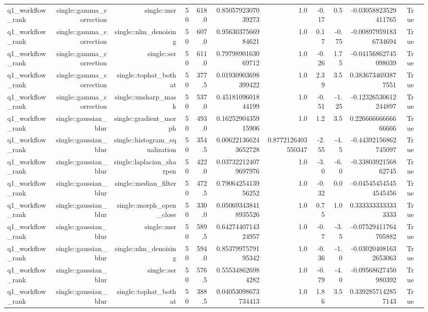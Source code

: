 \begin{tabular}{lrrrrrrrrrrr}
q1\_workflow\_rank & single::gamma\_correction & single::msr & 50 & 618.0 & 0.8505792307039273 & 1.0 & -0.17 & 0.5 & -0.03058823529411765 & True &  \\
q1\_workflow\_rank & single::gamma\_correction & single::nlm\_denoising & 50 & 607.0 & 0.9563037566984621 & 1.0 & 0.17 & -0.75 & -0.008979591836734694 & True &  \\
q1\_workflow\_rank & single::gamma\_correction & single::ssr & 50 & 611.0 & 0.7979890163069712 & 1.0 & -0.26 & 1.75 & -0.04156862745098039 & True &  \\
q1\_workflow\_rank & single::gamma\_correction & single::tophat\_bothat & 50 & 377.5 & 0.01930903698399422 & 1.0 & 2.39 & 3.5 & 0.3836734693877551 & True &  \\
q1\_workflow\_rank & single::gamma\_correction & single::unsharp\_mask & 50 & 537.0 & 0.4518109601844199 & 1.0 & -0.51 & -1.25 & -0.12326530612244897 & True &  \\
q1\_workflow\_rank & single::gaussian\_blur & single::gradient\_morph & 50 & 493.0 & 0.1625290435915906 & 1.0 & 1.2 & 3.5 & 0.22666666666666666 & True &  \\
q1\_workflow\_rank & single::gaussian\_blur & single::histogram\_equalization & 50 & 354.5 & 0.006221366243652728 & 0.8772126403550347 & -2.55 & -4.5 & -0.44392156862745097 & True &  \\
q1\_workflow\_rank & single::gaussian\_blur & single::laplacian\_sharpen & 50 & 422.0 & 0.037322124079697976 & 1.0 & -3.0 & -6.0 & -0.3380392156862745 & True &  \\
q1\_workflow\_rank & single::gaussian\_blur & single::median\_filter & 50 & 472.5 & 0.7906425413956252 & 1.0 & -0.32 & 0.0 & -0.045454545454545456 & True &  \\
q1\_workflow\_rank & single::gaussian\_blur & single::morph\_open\_close & 50 & 330.0 & 0.050693438418935526 & 1.0 & 0.75 & 1.0 & 0.3333333333333333 & True &  \\
q1\_workflow\_rank & single::gaussian\_blur & single::msr & 50 & 589.5 & 0.6427440714324957 & 1.0 & -0.7 & -3.5 & -0.07529411764705882 & True &  \\
q1\_workflow\_rank & single::gaussian\_blur & single::nlm\_denoising & 50 & 594.0 & 0.8537997579195342 & 1.0 & -0.36 & -1.0 & -0.030204081632653063 & True &  \\
q1\_workflow\_rank & single::gaussian\_blur & single::ssr & 50 & 576.5 & 0.555348626984282 & 1.0 & -0.79 & -4.0 & -0.09568627450980392 & True &  \\
q1\_workflow\_rank & single::gaussian\_blur & single::tophat\_bothat & 50 & 388.5 & 0.04053098673734413 & 1.0 & 1.86 & 3.5 & 0.3392857142857143 & True &  \\

\end{tabular}
